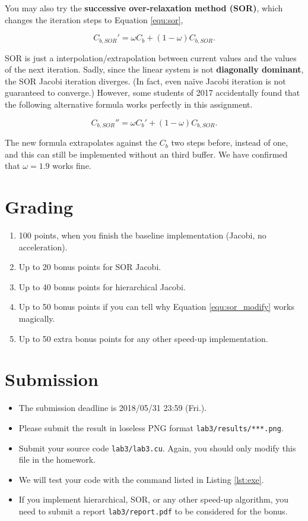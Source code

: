 \documentclass[12pt,a4paper]{article}
\newcommand{\equref}[1]{Equation \ref{equ:#1}}
\newcommand{\lstref}[1]{Listing \ref{lst:#1}}
\begin{document}
You may also try the \textbf{successive over-relaxation method (SOR)},
which changes the iteration steps to \equref{sor},

\begin{equation}
C_{b,SOR}' = \omega C_b + (1-\omega) C_{b,SOR}.
\label{equ:sor}
\end{equation}

SOR is just a interpolation/extrapolation between
current values and the values of the next iteration.
Sadly, since the linear system is not \textbf{diagonally dominant},
the SOR Jacobi iteration diverges.
(In fact, even na\"ive Jacobi iteration is not guaranteed to converge.)
However, some students of 2017 accidentally found that the following
alternative formula works perfectly in this assignment.

\begin{equation}
C_{b,SOR}'' = \omega C_b' + (1-\omega) C_{b,SOR}.
\label{equ:sor_modify}
\end{equation}

The new formula extrapolates against the $C_b$ two steps before,
instead of one, and this can still be implemented without an third buffer.
We have confirmed that $\omega = 1.9$ works fine.

\section{Grading}
\begin{enumerate}
\item 100 points, when you finish the baseline implementation (Jacobi, no acceleration).
\item Up to 20 bonus points for SOR Jacobi.
\item Up to 40 bonus points for hierarchical Jacobi.
\item Up to 50 bonus points if you can tell why Equation \ref{equ:sor_modify} works magically.
\item Up to 50 extra bonus points for any other speed-up implementation.
\end{enumerate}

\section{Submission}
\begin{itemize}
	\item The submission deadline is 2018/05/31 23:59 (Fri.).
\item Please submit the result in loseless PNG format \verb+lab3/results/***.png+.
\item Submit your source code \verb+lab3/lab3.cu+. Again, you should only modify this file in the homework.
\item We will test your code with the command listed in \lstref{exe}.
\item If you implement hierarchical, SOR, or any other speed-up algorithm, you need to submit a report \verb+lab3/report.pdf+ to be considered for the bonus.
\end{itemize}
\end{document}

